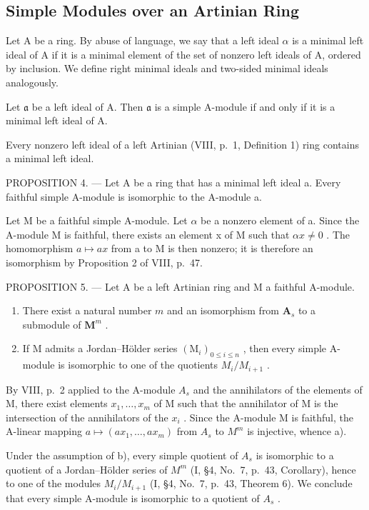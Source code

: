 \subsection{Simple Modules over an Artinian Ring}

Let A be a ring. By abuse of language, we say that a left ideal \(\alpha\) is a minimal left ideal of A if it is a minimal element of the set of nonzero left ideals of A, ordered by inclusion. We define right minimal ideals and two-sided minimal ideals analogously.

Let \(\mathfrak{a}\) be a left ideal of A. Then \(\mathfrak{a}\) is a simple A-module if and only if it is a minimal left ideal of A.

Every nonzero left ideal of a left Artinian (VIII, p.~1, Definition 1) ring contains a minimal left ideal.

PROPOSITION 4. --- Let A be a ring that has a minimal left ideal a. Every faithful simple A-module is isomorphic to the A-module a.

Let M be a faithful simple A-module. Let \(\alpha\) be a nonzero element of a. Since the A-module M is faithful, there exists an element x of M such that \(\alpha x \neq 0\) . The homomorphism \(a \mapsto ax\) from a to M is then nonzero; it is therefore an isomorphism by Proposition 2 of VIII, p.~47.

PROPOSITION 5. --- Let A be a left Artinian ring and M a faithful A-module.

\begin{enumerate}
\def\labelenumi{\alph{enumi})}
\item
  There exist a natural number \(m\) and an isomorphism from \(\mathbf{A}_s\) to a submodule of \(\mathbf{M}^m\) .
\item
  If M admits a Jordan--Hölder series \((\mathrm{M}_{i})_{0\leqslant i\leqslant n}\) , then every simple A-module is isomorphic to one of the quotients \(M_{i}/M_{i+1}\) .
\end{enumerate}

By VIII, p.~2 applied to the A-module \(A_{s}\) and the annihilators of the elements of M, there exist elements \(x_{1},\ldots,x_{m}\) of M such that the annihilator of M is the intersection of the annihilators of the \(x_{i}\) . Since the A-module M is faithful, the A-linear mapping \(a\mapsto(ax_{1},\ldots,ax_{m})\) from \(A_{s}\) to \(M^{m}\) is injective, whence a).

Under the assumption of b), every simple quotient of \(A_{s}\) is isomorphic to a quotient of a Jordan--Hölder series of \(M^{m}\) (I, §4, No.~7, p.~43, Corollary), hence to one of the modules \(M_{i}/M_{i+1}\) (I, §4, No.~7, p.~43, Theorem 6). We conclude that every simple A-module is isomorphic to a quotient of \(A_{s}\) .

